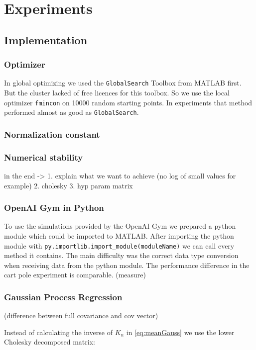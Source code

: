 \chapter{Experiments}
\label{chap:3}
%

\section{Implementation}

\subsection{Optimizer}
In global optimizing we used the \texttt{GlobalSearch} Toolbox from MATLAB first. But the cluster lacked of free licences for this toolbox. So we use the local optimizer \texttt{fmincon} on 10000 random starting points. In experiments that method performed almost as good as \texttt{GlobalSearch}.

\subsection{Normalization constant}

\subsection{Numerical stability}
in the end -> 1. explain what we want to achieve (no log of small values for example)
2. cholesky
3. hyp param matrix

\subsection{OpenAI Gym in Python}
To use the simulations provided by the OpenAI Gym we prepared a python module which could be imported to MATLAB. After importing the python module with \verb|py.importlib.import_module(moduleName)| we can call every method it contains. The main difficulty was the correct data type conversion when receiving data from the python module. The performance difference in the cart pole experiment is comparable. (measure)

\subsection{Gaussian Process Regression}

(difference between full covariance and cov vector)

Instead of calculating the inverse of $K_n$ in \eqref{eq:meanGauss} we use the lower Cholesky decomposed matrix:

